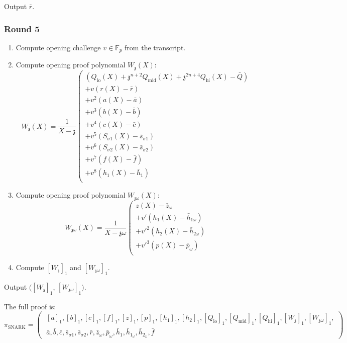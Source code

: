 \documentclass[fleqn]{article}
\begin{document}
				Output $\bar{r}$.

			\subsubsection*{Round 5}
				\begin{enumerate}
					\item Compute opening challenge $v\in \mathbb{F}_p$ from the transcript.
					
					\item Compute opening proof polynomial $W_\mathfrak{z}(X)$:
						\[W_\mathfrak{z}(X) = \frac{1}{X-\mathfrak{z}}\left(\begin{array}{ll}(
						Q_\mathrm{lo}(X) + \mathfrak{z}^{n+2} Q_\mathrm{mid}(X) + \mathfrak{z}^{2n+4}Q_\mathrm{hi}(X) - \bar{Q})\\
						+ v(r(X)-\bar{r}) \\ 
						+ v^2(a(X)-\bar{a}) \\ 
						+ v^3(b(X)-\bar{b}) \\ 
						+ v^4(c(X)-\bar{c}) \\ 
						+ v^5(S_{\sigma 1}(X) - \bar{s}_{\sigma 1}) \\ 
						+ v^6(S_{\sigma 2}(X)  - \bar{s}_{\sigma 2}) \\
						+ v^7 (f(X) - \bar{f}) \\ 
						+v^8(h_1(X)-\bar{h}_1) \\ 
						\end{array}\right.\]
					    
					\item Compute opening proof polynomial $W_{\mathfrak{z}\omega}(X)$:				
						\[W_{\mathfrak{z}\omega}(X) =
						\frac{1}{X-\mathfrak{z}\omega}\left(\begin{array}{ll} z(X) - \bar{z}_\omega\\
						+ v'(h_1(X) - \bar{h}_{1\omega}) \\
						+ v'^2(h_2(X)-\bar{h}_{2\omega})\\
						+ v'^3(p(X)-\bar{p}_\omega)\\ 
						\end{array}\right.\]
					    
					\item Compute $[W_\mathfrak{z}]_1$ and $[W_{\mathfrak{z}\omega}]_1$.
				\end{enumerate}

				Output $([W_\mathfrak{z}]_1$, $[W_{\mathfrak{z}\omega}]_1)$.
				
				The full proof is:
					\[\pi_{\text{SNARK}} = \left(\;\begin{array}{ll} [a]_1, [b]_1, [c]_1, [f]_1, [z]_1, [p]_1, [h_1]_1, [h_2]_1, [Q_{\text{lo}}]_1, [Q_{\text{mid}}]_1, [Q_{\text{hi}}]_1, [W_\mathfrak{z}]_1, [W_{\mathfrak{z}\omega}]_1,\\
					\bar{a}, \bar{b}, \bar{c},\bar{s}_{\sigma 1}, \bar{s}_{\sigma 2},\bar{r}, \bar{z}_\omega, \bar{p}_\omega, \bar{h}_1, \bar{h}_{1_\omega}, \bar{h}_{2_\omega}, \bar{f}\end{array}\right)\]
\end{document}
